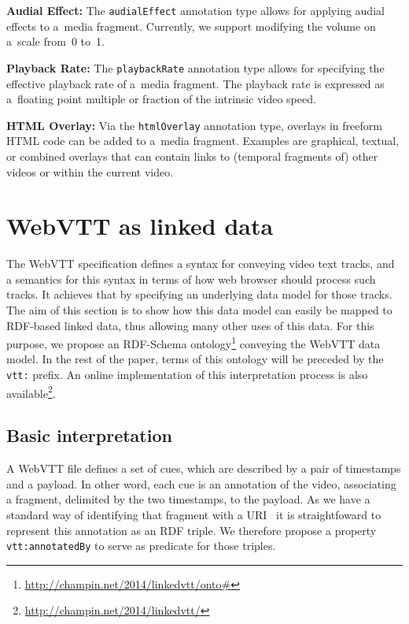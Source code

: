 \documentclass{sig-alternate}
\newcommand{\inlinelistingsize}{\fontsize{8pt}{11pt}}
\let\oldurl\url
\renewcommand{\url}[1]{\inlinelistingsize\oldurl{#1}}
\newcommand{\vtt}[1]{\texttt{vtt:#1}}
\begin{document}
\noindent \textbf{Audial Effect:} The \texttt{audialEffect} annotation type
  allows for applying audial effects to a~media fragment.
  Currently, we support modifying the volume on a~scale
  from~0 to~1.

\noindent \textbf{Playback Rate:} The \texttt{playbackRate}
  annotation type allows for specifying the effective
  playback rate of a~media fragment.
  The playback rate is expressed as a~floating point
  multiple or fraction of the intrinsic video speed.

\noindent \textbf{HTML Overlay:} Via the \texttt{htmlOverlay}
  annotation type, overlays in
  freeform HTML code can be added to a~media fragment.
  Examples are graphical, textual, or combined overlays
  that can contain links to (temporal fragments of)
  other videos or within the current video.

\section{WebVTT as linked data}

The WebVTT specification defines a syntax for conveying video text tracks,
and a semantics for this syntax in terms of how web browser should process such tracks.
It achieves that by specifying an underlying data model for those tracks.
The aim of this section is to show
how this data model can easily be mapped to RDF-based linked data,
thus allowing many other uses of this data.
For this purpose, we propose an RDF-Schema ontology\footnote{
  \url{http://champin.net/2014/linkedvtt/onto\#}
} conveying the WebVTT data model.
In the rest of the paper, terms of this ontology will be preceded by the \vtt{} prefix.
An online implementation of this interpretation process is also available\footnote{
  \url{http://champin.net/2014/linkedvtt/}
}.

\subsection{Basic interpretation}

A WebVTT file defines a set of cues,
which are described by a pair of timestamps and a payload.
In other word, each cue is an annotation of the video,
associating a fragment, delimited by the two timestamps, to the payload.
As we have a standard way of identifying that fragment with a URI~\cite{troncy2012mediafragments}
it is straightfoward to represent this annotation as an RDF triple.
We therefore propose a property \vtt{annotatedBy} to serve as predicate for those triples.
\end{document}
